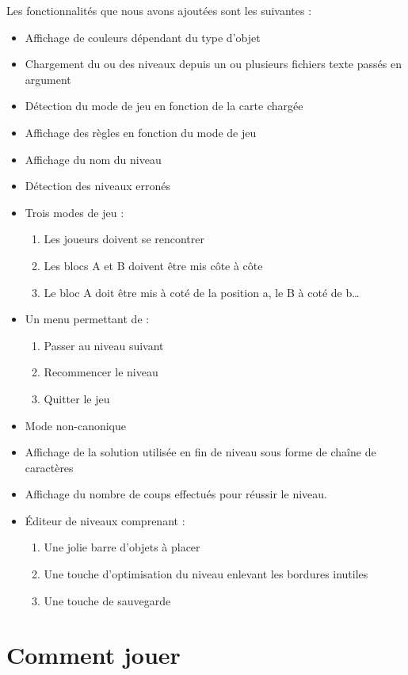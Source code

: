 \documentclass{article}
\begin{document}
Les fonctionnalités que nous avons ajoutées sont les suivantes :
\begin{itemize}
    \item Affichage de couleurs dépendant du type d'objet
    \item Chargement du ou des niveaux depuis un ou plusieurs fichiers texte passés en argument
    \item Détection du mode de jeu en fonction de la carte chargée
    \item Affichage des règles en fonction du mode de jeu
    \item Affichage du nom du niveau
    \item Détection des niveaux erronés
    \item Trois modes de jeu :
    \begin{enumerate}
        \item Les joueurs doivent se rencontrer
        \item Les blocs A et B doivent être mis côte à côte
        \item Le bloc A doit être mis à coté de la position a, le B à coté de b…
    \end{enumerate}
    \item Un menu permettant de :
    \begin{enumerate}
        \item Passer au niveau suivant
        \item Recommencer le niveau
        \item Quitter le jeu
    \end{enumerate}
    \item Mode non-canonique
    \item Affichage de la solution utilisée en fin de niveau sous forme de chaîne de caractères
    \item Affichage du nombre de coups effectués pour réussir le niveau.
    \item Éditeur de niveaux comprenant :
    \begin{enumerate}
        \item Une jolie barre d'objets à placer
        \item Une touche d'optimisation du niveau enlevant les bordures inutiles
        \item Une touche de sauvegarde
    \end{enumerate}
\end{itemize}

\section{Comment jouer}
\end{document}

